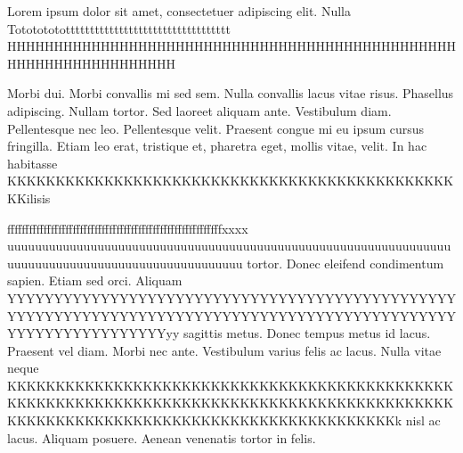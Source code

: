 \documentclass[a4paper]{article}
\begin{document}
\listoftodos

Lorem ipsum dolor sit amet, consectetuer adipiscing elit. Nulla
%
Totototototttttttttttttttttttttttttttttttttt
%
HHHHHHHHHHHHHHHHHHHHHHHHHHHHHHHHHHHHHHHHHHHHHHHHHHHHHHHHHHHHHHHHHH

Morbi dui. Morbi convallis mi sed sem. Nulla convallis lacus vitae
risus. Phasellus adipiscing. Nullam tortor. Sed laoreet aliquam
ante. Vestibulum diam. Pellentesque nec leo. Pellentesque velit.
%
Praesent congue mi eu ipsum cursus fringilla. Etiam leo erat,
tristique et, pharetra eget, mollis vitae, velit. In hac habitasse
%
KKKKKKKKKKKKKKKKKKKKKKKKKKKKKKKKKKKKKKKKKKKKKKKKilisis


fffffffffffffffffffffffffffffffffffffffffffffffffffffffffffxxxx
%
uuuuuuuuuuuuuuuuuuuuuuuuuuuuuuuuuuuuuuuuuuuuuuuuuuuuuuuuuuuuuuuuuuuuuuuuuuuuuuuuuuuuuuuuuuuuuuuuuu
tortor. Donec eleifend condimentum sapien. Etiam sed orci. Aliquam
%
YYYYYYYYYYYYYYYYYYYYYYYYYYYYYYYYYYYYYYYYYYYYYYYYYYYYYYYYYYYYYYYYYYYYYYYYYYYYYYYYYYYYYYYYYYYYYYYYYYYYYYYYYYYYYYYYYyy
sagittis metus. Donec tempus metus id lacus. Praesent vel diam.
Morbi nec ante. Vestibulum varius felis ac lacus. Nulla vitae neque
%
KKKKKKKKKKKKKKKKKKKKKKKKKKKKKKKKKKKKKKKKKKKKKKKKKKKKKKKKKKKKKKKKKKKKKKKKKKKKKKKKKKKKKKKKKKKKKKKKKKKKKKKKKKKKKKKKKKKKKKKKKKKKKKKKKKKKk
nisl ac lacus. Aliquam posuere. Aenean venenatis tortor in felis.
\end{document}
